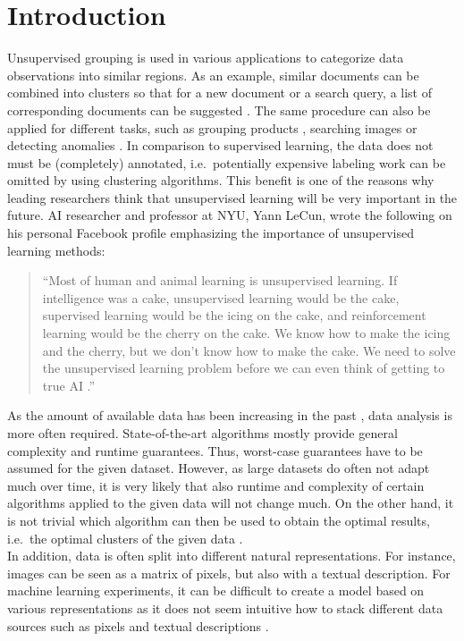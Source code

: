 \chapter{Introduction}


Unsupervised grouping is used in various applications to categorize data observations into similar regions. As an example, similar documents can be combined into clusters so that for a new document or a search query, a list of corresponding documents can be suggested \cite{zamir1998web}. The same procedure can also be applied for different tasks, such as grouping products \cite{balakrishnan2018product}, searching images \cite{lin2018dimensionality} or detecting anomalies \cite{he2003discovering}. In comparison to supervised learning, the data does not must be (completely) annotated, i.e.\ potentially expensive labeling work can be omitted by using clustering algorithms. This benefit is one of the reasons why leading researchers think that unsupervised learning will be very important in the future. AI researcher and professor at NYU, Yann LeCun, wrote the following on his personal Facebook profile emphasizing the importance of unsupervised learning methods:

\blockquote{``Most of human and animal learning is unsupervised learning. If intelligence was a cake, unsupervised learning would be the cake, supervised learning would be the icing on the cake, and reinforcement learning would be the cherry on the cake. We know how to make the icing and the cherry, but we don’t know how to make the cake. We need to solve the unsupervised learning problem before we can even think of getting to true AI \cite{lecun}.''}

As the amount of available data has been increasing in the past \cite{wamba2015big}, data analysis is more often required. State-of-the-art algorithms mostly provide general complexity and runtime guarantees. Thus, worst-case guarantees have to be assumed for the given dataset. However, as large datasets do often not adapt much over time, it is very likely that also runtime and complexity of certain algorithms applied to the given data will not change much. On the other hand, it is not trivial which algorithm can then be used to obtain the optimal results, i.e.\ the optimal clusters of the given data \cite{DBLP:journals/corr/GuptaR15b}.\\

In addition, data is often split into different natural representations. For instance, images can be seen as a matrix of pixels, but also with a textual description. For machine learning experiments, it can be difficult to create a model based on various representations as it does not seem intuitive how to stack different data sources such as pixels and textual descriptions \cite{cebral2018combining}.\\

